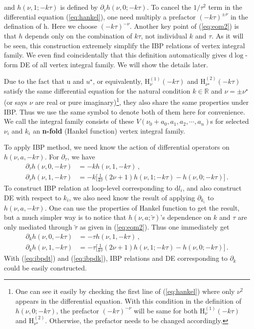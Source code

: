 \documentclass[a4paper,11pt]{article}
\newcommand{\nn}{\nonumber}
\newcommand{\nd}{\mathrm{d}}
\def\eqref#1{(\ref{#1})}
\begin{document}
and $ h(\nu,1;-k\tau)$ is defined by $\partial_{\tilde{\tau}}h(\nu,0;-k\tau)$. To cancel the $1/\tau^2$  term in the differential equation \eqref{eq:hankel}, one need multiply  a prefactor  $(-k\tau)^{\pm\nu}$ in the defination of h. Here we choose $(-k\tau)^{-\nu}$.  Another key point of \eqref{eq:eom2} is that $h$ depends only on the combination of $k\tau$, not individual $k$ and $\tau$.  As it will be seen, this construction  extremely simplify the IBP relations of vertex integral family. We even find  coincidentally that this definition  automatically gives $\nd \log$-form DE of all vertex integral family. We will show the details later. 

Due to the fact that u and $u^\star$, or equivalently, $\text{H}_{\nu}^{(1)}(-k \tau)$ and $\text{H}_{\nu^\star}^{(2)}(-k \tau)$ satisfy the same differential equation for the natural condition $k\in \mathbb{R}$ and $\nu=\pm\nu^\star$ (or says $\nu$ are real or pure imaginary)\footnote{One can see it easily by checking the first line  of \eqref{eq:hankel} where only $\nu^2$ appears in the differential equation. With this condition in the definition of $h(\nu,0;-k\tau)$, the prefactor $(-k\tau)^{-\nu}$ will be same for both $\text{H}_{\nu}^{(1)}(-k \tau)$ and $\text{H}_{\nu^\star}^{(2)} $. Otherwise, the prefactor needs to be changed accordingly. }, they also share the same properties under IBP. Thus we use the same symbol to denote both of them here for convenience. 
We call the integral family consists of these $V(\nu_0+a_0,a_1,a_2,\cdots,a_n)$s for selected $\nu_i$ and $k_i$ an \textbf{n-fold} (Hankel function) vertex integral family.

To apply IBP method, we need know the action of differential operators on  $h(\nu,a,-k\tau)$. For $\partial_\tau$, we have
\begin{align}
 \partial_\tau h(\nu,0,-k\tau) &= -k h(\nu,1,-k\tau) \, ,\nn\\
 \partial_\tau h(\nu,1,-k\tau) &= -k \Big[ \frac{1}{k\tau}(2\nu+1)h(\nu,1;-k\tau) - h(\nu,0;-k\tau) \Big] \, .\label{eq:ibpdt}
\end{align}
To construct IBP relation at loop-level corresponding to $\nd l_i$, and also construct DE with respect to $k_i$, we also need know the result of applying $\partial_{k_i}$ to $h(\nu,a,-k\tau)$. One can use the properties of Hankel function to get the result, but a much simpler way is to notice that $h(\nu,a;\tilde{\tau})$'s dependence on $k$ and $\tau$ are only mediated through $\tilde{\tau}$ as given in 
\eqref{eq:eom2}. Thus one immediately get
\begin{align}
 \partial_k h(\nu,0,-k\tau) &= -\tau h(\nu,1,-k\tau) \, ,\nn\\
 \partial_k h(\nu,1,-k\tau) &= -\tau \Big[ \frac{1}{k\tau}(2\nu+1)h(\nu,1;-k\tau) - h(\nu,0;-k\tau) \Big] \, . \label{eq:ibpdk}
\end{align}
With \eqref{eq:ibpdt} and \eqref{eq:ibpdk}, IBP relations and DE corresponding to $\partial_k$ could be easily constructed. 
\end{document}

